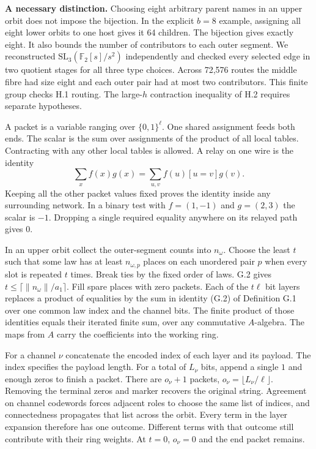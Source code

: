 \textbf{A necessary distinction.} Choosing eight arbitrary parent names in an upper orbit does not impose the bijection. In the explicit $b=8$ example, assigning all eight lower orbits to one host gives it 64 children. The bijection gives exactly eight. It also bounds the number of contributors to each outer segment. We reconstructed $\mathrm{SL}_3(\mathbb F_2[s]/s^2)$ independently and checked every selected edge in two quotient stages for all three type choices. Across 72,576 routes the middle fibre had size eight and each outer pair had at most two contributors. This finite group checks H.1 routing. The large-$h$ contraction inequality of H.2 requires separate hypotheses.


\newpage
{}
A packet is a variable ranging over $\{0,1\}^{\ell}$. One shared assignment feeds both ends. The scalar is the sum over assignments of the product of all local tables. Contracting with any other local tables is allowed. A relay on one wire is the identity
\[
   \sum_x f(x)g(x)=\sum_{u,v} f(u)[u=v]g(v).
\]
Keeping all the other packet values fixed proves the identity inside any surrounding network. In a binary test with $f=(1,-1)$ and $g=(2,3)$ the scalar is $-1$. Dropping a single required equality anywhere on its relayed path gives $0$.

In an upper orbit collect the outer-segment counts into $n_\omega$. Choose the least $t$ such that some law has at least $n_{\omega,p}$ places on each unordered pair $p$ when every slot is repeated $t$ times. Break ties by the fixed order of laws. G.2 gives $t\le\lceil\|n_\omega\|/a_1\rceil$. Fill spare places with zero packets. Each of the $t\ell$ bit layers replaces a product of equalities by the sum in identity (G.2) of Definition G.1 over one common law index and the channel bits. The finite product of those identities equals their iterated finite sum, over any commutative $A$-algebra. The maps from $A$ carry the coefficients into the working ring.

For a channel $\nu$ concatenate the encoded index of each layer and its payload. The index specifies the payload length. For a total of $L_\nu$ bits, append a single $1$ and enough zeros to finish a packet. There are $o_\nu+1$ packets, $o_\nu=\lfloor L_\nu/\ell\rfloor$. Removing the terminal zeros and marker recovers the original string. Agreement on channel codewords forces adjacent roles to choose the same list of indices, and connectedness propagates that list across the orbit. Every term in the layer expansion therefore has one outcome. Different terms with that outcome still contribute with their ring weights. At $t=0$, $o_\nu=0$ and the end packet remains.


